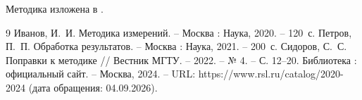 Методика изложена в \cite{ivanov}.

\begin{thebibliography}{9}
   Иванов, И.~И. Методика измерений. – Москва : Наука, 2020. – 120~с.
   Петров, П.~П. Обработка результатов. -- Москва : Наука, 2021. -- 200~с.
   Сидоров, С.~С. Поправки к методике // Вестник МГТУ. – 2022. –
  № 4. – С. 12--20.
   Библиотека : официальный сайт. – Москва, 2024. –
  URL: https://www.rsl.ru/catalog/2020-2024 (дата обращения: 04.09.2026).
\end{thebibliography}
